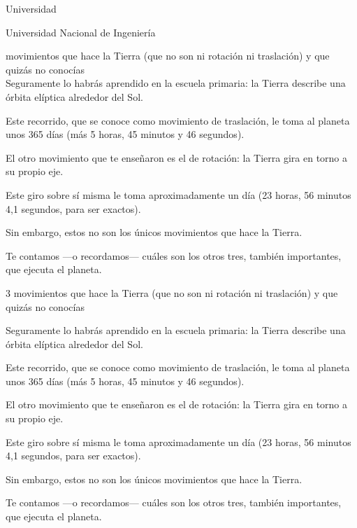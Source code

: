 \documentclass[12pt,a4paper]{article}
\begin{document}
\begin{center}%
	Universidad
\end{center}

\noindent Universidad Nacional de Ingeniería

 movimientos que hace la Tierra (que no son ni rotación ni traslación) 
y que quizás no conocías\\[3cm]


Seguramente lo habrás aprendido en la escuela primaria: la Tierra describe una órbita elíptica alrededor del Sol.

Este recorrido, que se conoce como movimiento de traslación, le toma al planeta unos 365 días 
(más 5 horas, 45 minutos y 46 segundos).

El otro movimiento que te enseñaron es el de rotación: la Tierra gira en torno a su propio eje.

Este giro sobre sí misma le toma aproximadamente un día (23 horas, 56 minutos 4,1 segundos, para ser exactos). 

Sin embargo, estos no son los únicos movimientos que hace la Tierra.

Te contamos —o recordamos— cuáles son los otros tres, también importantes, que ejecuta el planeta.

3 movimientos que hace la Tierra (que no son ni rotación ni traslación) 
y que quizás no conocías


Seguramente lo habrás aprendido en la escuela primaria: la Tierra describe una órbita elíptica alrededor del Sol.

Este recorrido, que se conoce como movimiento de traslación, le toma al planeta unos 365 días 
(más 5 horas, 45 minutos y 46 segundos).

El otro movimiento que te enseñaron es el de rotación: la Tierra gira en torno a su propio eje.

Este giro sobre sí misma le toma aproximadamente un día (23 horas, 56 minutos 4,1 segundos, para ser exactos). 

Sin embargo, estos no son los únicos movimientos que hace la Tierra.

Te contamos —o recordamos— cuáles son los otros tres, también importantes, que ejecuta el planeta.
\end{document}
